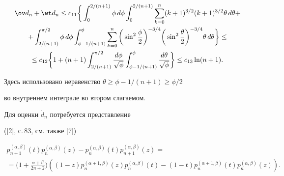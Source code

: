 \begin{multline}


\ov d_n +\wt d_n \le c_{11}\bigg\{


\int_0^{2/(n+1)}\phi\, d\phi \int_0^{2/(n+1)}


\sum_{k=0}^n (k+1)^{{3}/{2}} (k+1)^{ {3}/{2}}\theta\, d\theta+ \\


%


+\int_{2/(n+1)}^{{\pi}/{2}}\phi\, d\phi


\int_{\phi -1/(n+1)}^\phi


\sum_{k=0}^n \bigg(\sin^2\frac{\phi}{2}\bigg)^{-{3}/{4}}


\bigg(\sin^2\frac{\theta}{2}\bigg)^{- {3}/{4}}\theta\, d\theta\bigg\}\le \\


%


\le c_{12}\bigg\{1+(n+1)


\int_{2/(n+1)}^{\pi /2}\frac{d\phi}{\sqrt {\phi} }


\int_{\phi -1/(n+1)}^\phi \frac{d\theta}{\sqrt {\phi}}\bigg\}


\le c_{13} \ln (n+1).


\end{multline}


Здесь использовано неравенство $\theta \ge \phi -1/(n+1)


\ge {\phi}/{2}$


во внутреннем интеграле во втором слагаемом.





Для оценки $\Dot d_n$ потребуется представление


([2], с.\,83, см. также [7])


\begin{multline*}


p_{n+1}^{(\alpha,\beta)}(t)


p_n^{(\alpha,\beta)}(z)-


p_{n}^{(\alpha,\beta)}(t)


p_{n+1}^{(\alpha,\beta)}(z)= \\


%


=\bigg(1+\frac{\alpha +\beta}{2n+2}\bigg)


((1-z) p_{n}^{(\alpha +1,\beta)}(z) p_n^{(\alpha,\beta)}(t)


-(1-t) p_{n}^{(\alpha +1,\beta)}(t)


p_n^{(\alpha,\beta)}(z)).


\end{multline*}


